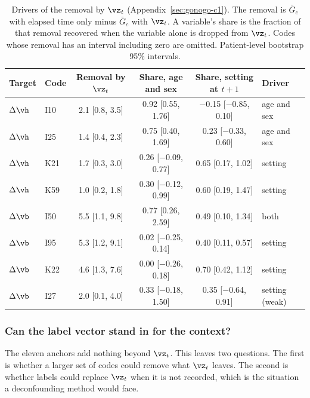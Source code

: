 \begin{table}[t]
\caption{Drivers of the removal by $\vz_t$ (Appendix~\ref{sec:gonogo-c1}). The removal is $\bar G_c$ with elapsed time only minus $\bar G_c$ with $\vz_t$. A variable's share is the fraction of that removal recovered when the variable alone is dropped from $\vz_t$. Codes whose removal has an interval including zero are omitted. Patient-level bootstrap 95\% intervals.}
\label{tab:gonogo-drivers}
\centering
\small
\begin{tabular}{@{}ll cccl@{}}
\toprule
\textbf{Target} & \textbf{Code} & \textbf{Removal by $\vz_t$} & \textbf{Share, age and sex} & \textbf{Share, setting at $t+1$} & \textbf{Driver} \\
\midrule
$\Delta\vh$ & I10 & 2.1 [0.8, 3.5] & 0.92 [0.55, 1.76] & $-$0.15 [$-$0.85, 0.10] & age and sex \\
$\Delta\vh$ & I25 & 1.4 [0.4, 2.3] & 0.75 [0.40, 1.69] & 0.23 [$-$0.33, 0.60] & age and sex \\
$\Delta\vh$ & K21 & 1.7 [0.3, 3.0] & 0.26 [$-$0.09, 0.77] & 0.65 [0.17, 1.02] & setting \\
$\Delta\vh$ & K59 & 1.0 [0.2, 1.8] & 0.30 [$-$0.12, 0.99] & 0.60 [0.19, 1.47] & setting \\
$\Delta\vb$ & I50 & 5.5 [1.1, 9.8] & 0.77 [0.26, 2.59] & 0.49 [0.10, 1.34] & both \\
$\Delta\vb$ & I95 & 5.3 [1.2, 9.1] & 0.02 [$-$0.25, 0.14] & 0.40 [0.11, 0.57] & setting \\
$\Delta\vb$ & K22 & 4.6 [1.3, 7.6] & 0.00 [$-$0.26, 0.18] & 0.70 [0.42, 1.12] & setting \\
$\Delta\vb$ & I27 & 2.0 [0.1, 4.0] & 0.33 [$-$0.18, 1.50] & 0.35 [$-$0.64, 0.91] & setting (weak) \\
\bottomrule
\end{tabular}
\end{table}

\subsubsection{Can the label vector stand in for the context?}
\label{sec:gonogo-labels}

The eleven anchors add nothing beyond $\vz_t$. This leaves two questions. The first is whether a larger set of codes could remove what $\vz_t$ leaves. The second is whether labels could replace $\vz_t$ when it is not recorded, which is the situation a deconfounding method would face.

